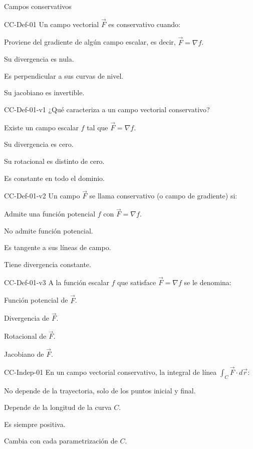 \documentclass[a4,11pt]{aleph-notas}
\begin{document}
\begin{quiz}{Campos conservativos}

\begin{multi}[]%
    {CC-Def-01}
    Un campo vectorial $\vec{F}$ es conservativo cuando:
    \item* Proviene del gradiente de algún campo escalar, es decir, $\vec{F} = \nabla f$.
    \item Su divergencia es nula.
    \item Es perpendicular a sus curvas de nivel.
    \item Su jacobiano es invertible.
\end{multi}

\begin{multi}[]%
    {CC-Def-01-v1}
    ¿Qué caracteriza a un campo vectorial conservativo?
    \item* Existe un campo escalar $f$ tal que $\vec{F}=\nabla f$.
    \item Su divergencia es cero.
    \item Su rotacional es distinto de cero.
    \item Es constante en todo el dominio.
\end{multi}

\begin{multi}[]%
    {CC-Def-01-v2}
    Un campo $\vec{F}$ se llama conservativo (o campo de gradiente) si:
    \item* Admite una función potencial $f$ con $\vec{F}=\nabla f$.
    \item No admite función potencial.
    \item Es tangente a sus líneas de campo.
    \item Tiene divergencia constante.
\end{multi}

\begin{multi}[]%
    {CC-Def-01-v3}
    A la función escalar $f$ que satisface $\vec{F}=\nabla f$ se le denomina:
    \item* Función potencial de $\vec{F}$.
    \item Divergencia de $\vec{F}$.
    \item Rotacional de $\vec{F}$.
    \item Jacobiano de $\vec{F}$.
\end{multi}

\begin{multi}[]%
    {CC-Indep-01}
    En un campo vectorial conservativo, la integral de línea $\displaystyle\int_C \vec{F}\cdot d\vec{r}$:
    \item* No depende de la trayectoria, solo de los puntos inicial y final.
    \item Depende de la longitud de la curva $C$.
    \item Es siempre positiva.
    \item Cambia con cada parametrización de $C$.
\end{multi}


\end{quiz}
\end{document}
